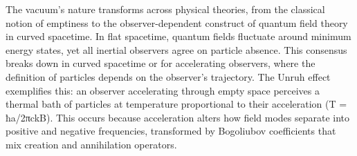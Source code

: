 The vacuum's nature transforms across physical theories, from the classical notion of emptiness to the observer-dependent construct of quantum field theory in curved spacetime. In flat spacetime, quantum fields fluctuate around minimum energy states, yet all inertial observers agree on particle absence. This consensus breaks down in curved spacetime or for accelerating observers, where the definition of particles depends on the observer's trajectory. The Unruh effect exemplifies this: an observer accelerating through empty space perceives a thermal bath of particles at temperature proportional to their acceleration (T = ħa/2πckB). This occurs because acceleration alters how field modes separate into positive and negative frequencies, transformed by Bogoliubov coefficients that mix creation and annihilation operators.